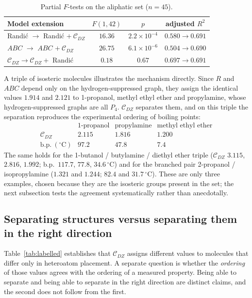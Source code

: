 \documentclass[11pt,a4paper]{article}
\theoremstyle{plain}
\theoremstyle{definition}
\theoremstyle{remark}
\newcommand{\CDZ}{\mathcal{C}_{DZ}}
\begin{document}
\begin{table}[htbp]
\centering
\caption{Partial $F$-tests on the aliphatic set ($n=45$).}
\label{tab:partialF}
\begin{tabular}{lccc}
\toprule
Model extension & $F(1,42)$ & $p$ & adjusted $R^2$ \\
\midrule
Randi\'c $\to$ Randi\'c $+\ \CDZ$ & $16.36$ & $2.2\times10^{-4}$ & $0.580\to0.691$ \\
$ABC$ $\to$ $ABC$ $+\ \CDZ$       & $26.75$ & $6.1\times10^{-6}$ & $0.504\to0.690$ \\
$\CDZ\to\CDZ+$ Randi\'c           & $0.18$  & $0.67$             & $0.697\to0.691$ \\
\bottomrule
\end{tabular}
\end{table}

A triple of isosteric molecules illustrates the mechanism directly. Since $R$
and $ABC$ depend only on the hydrogen-suppressed graph, they assign the
identical values
$1.914$ and $2.121$ to 1-propanol, methyl ethyl ether and propylamine, whose
hydrogen-suppressed graphs are all $P_4$. $\CDZ$ separates them, and on this
triple the separation reproduces the experimental ordering of boiling points:
\[
\begin{array}{lccc}
 & \text{1-propanol} & \text{propylamine} & \text{methyl ethyl ether}\\[2pt]
\CDZ & 2.115 & 1.816 & 1.200\\
\text{b.p.}~(^\circ\mathrm C) & 97.2 & 47.8 & 7.4
\end{array}
\]
The same holds for the 1-butanol / butylamine / diethyl ether triple
($\CDZ$ $3.115$, $2.816$, $1.992$; b.p.\ $117.7$, $77.8$, $34.6\,^\circ$C) and for
the branched pair 2-propanol / isopropylamine ($1.321$ and $1.244$; $82.4$ and
$31.7\,^\circ$C). These are only three examples, chosen because they are the
isosteric groups present in the set; the next subsection tests the agreement
systematically rather than anecdotally.

\subsection{Separating structures versus separating them in the right direction}
\label{sec:ranking}

Table~\ref{tab:labelled} establishes that $\CDZ$ assigns different values to
molecules that differ only in heteroatom placement. A separate question is
whether the \emph{ordering} of those values agrees with the ordering of a
measured property. Being able to separate and being able to separate in the right
direction are distinct claims, and the second does not follow from the first.
\end{document}
